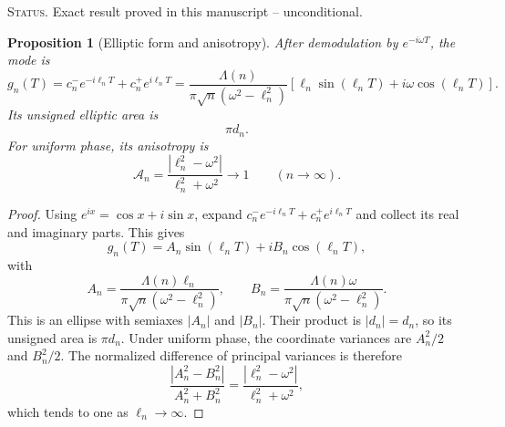\documentclass[11pt]{amsart}
\numberwithin{equation}{section}
\theoremstyle{plain}
\newtheorem{proposition}[theorem]{Proposition}
\theoremstyle{definition}
\theoremstyle{remark}
\newcommand{\1}{\mathbf{1}}
\newcommand{\statusnote}[1]{%
  \par\smallskip\noindent
  \begingroup\footnotesize\textsc{Status.} #1\endgroup
  \par\smallskip}
\begin{document}
\statusnote{Exact result proved in this manuscript -- unconditional.}
\begin{proposition}[Elliptic form and anisotropy]
\label{prop:ellipse_anisotropy}
After demodulation by \(e^{-i\omega T}\), the mode is
\begin{equation}
g_n(T)
=
c_n^-e^{-i\ell_nT}
+
c_n^+e^{i\ell_nT}
=
\frac{\Lambda(n)}
{\pi\sqrt n(\omega^2-\ell_n^2)}
\left[
\ell_n\sin(\ell_nT)
+
i\omega\cos(\ell_nT)
\right].
\label{eq:gn_ellipse}
\end{equation}
Its unsigned elliptic area is
\begin{equation}
\pi d_n.
\label{eq:ellipse_area}
\end{equation}
For uniform phase, its anisotropy is
\begin{equation}
\mathcal A_n
=
\frac{|\ell_n^2-\omega^2|}{\ell_n^2+\omega^2}
\longrightarrow1
\qquad(n\to\infty).
\label{eq:single_mode_anisotropy}
\end{equation}
\end{proposition}

\begin{proof}
Using \(e^{ix}=\cos x+i\sin x\), expand
\(c_n^-e^{-i\ell_nT}+c_n^+e^{i\ell_nT}\) and collect its real and
imaginary parts.  This gives
\begin{equation}
g_n(T)=A_n\sin(\ell_nT)+iB_n\cos(\ell_nT),
\label{eq:ellipse_parametric_proof}
\end{equation}
with
\begin{equation}
A_n=
\frac{\Lambda(n)\ell_n}{\pi\sqrt n(\omega^2-\ell_n^2)},
\qquad
B_n=
\frac{\Lambda(n)\omega}{\pi\sqrt n(\omega^2-\ell_n^2)}.
\label{eq:ellipse_axes_proof}
\end{equation}
This is an ellipse with semiaxes \(|A_n|\) and \(|B_n|\).  Their product
is \(|d_n|=d_n\), so its unsigned area is \(\pi d_n\).  Under uniform
phase, the coordinate variances are \(A_n^2/2\) and \(B_n^2/2\).  The
normalized difference of principal variances is therefore
\begin{equation}
\frac{|A_n^2-B_n^2|}{A_n^2+B_n^2}
=
\frac{|\ell_n^2-\omega^2|}{\ell_n^2+\omega^2},
\label{eq:anisotropy_proof_ratio}
\end{equation}
which tends to one as \(\ell_n\to\infty\).
\end{proof}
\end{document}
